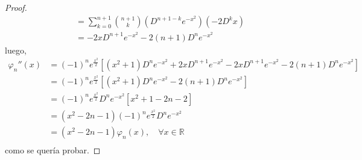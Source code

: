 \documentclass[12pt]{report}
\theoremstyle{largebreak}
\begin{document}
\begin{proof}
\begin{equation*}
\begin{split}
                &=\sum_{ k=0}^{n+1} \binom{n +1}{k} (D^{n+1-k}e^{-x^2})(-2D^k x)\\
                &=-2xD^{n+1}e^{-x^2}-2(n+1)D^{n}e^{-x^2}
            \end{split}
        \end{equation*}
        luego,
        \begin{equation*}
            \begin{split}
                \varphi_n''(x)&=(-1)^ne^{\frac{x^2}{2}}\left[(x^2+1)D^ne^{-x^2}+2xD^{n+1}e^{-x^2}-2xD^{n+1}e^{-x^2}-2(n+1)D^ne^{-x^2} \right]\\
                &=(-1)^ne^{\frac{x^2}{2}}\left[(x^2+1)D^ne^{-x^2}-2(n+1)D^ne^{-x^2} \right]\\
                &=(-1)^ne^{\frac{x^2}{2}}D^ne^{-x^2} \left[x^2+1-2n-2 \right]\\
                &=(x^2-2n-1)(-1)^ne^{\frac{x^2}{2}}D^ne^{-x^2}\\
                &=(x^2-2n-1)\varphi_n(x),\quad\forall x\in\mathbb{R}\\ 
            \end{split}
        \end{equation*}
        como se quería probar.


\end{proof}
\end{document}
